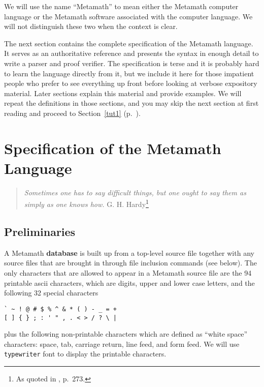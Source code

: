 We will use the name ``Metamath'' to mean either the Metamath
computer language or the Metamath software associated with the computer
language.  We will not distinguish these two when the context is clear.

The next section contains the complete specification of the Metamath
language.
It serves as an
authoritative reference and presents the syntax in enough detail to
write a parser and proof verifier.  The
specification is terse and it is probably hard to learn the language
directly from it, but we include it here for those impatient people who
prefer to see everything up front before looking at verbose expository
material.  Later sections explain this material and provide examples.
We will repeat the definitions in those sections, and you may skip the
next section at first reading and proceed to Section~\ref{tut1}
(p.~\pageref{tut1}).

\section{Specification of the Metamath Language}\label{spec}

\begin{quote}
  {\em Sometimes one has to say difficult things, but one ought to say
them as simply as one knows how.}
    \flushright\sc  G. H. Hardy\footnote{As quoted in
    \cite{deMillo}, p.~273.}\\
\end{quote}

\subsection{Preliminaries}\label{spec1}

A Metamath {\bf database} is built up from a top-level source
file together with any source files that are brought in through file inclusion
commands (see below).  The only characters that are allowed to appear in a
Metamath source file are the 94 printable {\sc
ascii} characters, which are digits, upper and lower
case letters, and the following 32 special characters
\label{spec1chars}

\begin{verbatim}
` ~ ! @ # $ % ^ & * ( ) - _ = +
[ ] { } ; : ' " , . < > / ? \ |
\end{verbatim}
plus the following non-printable characters which are
defined as ``white space'' characters: space, tab,
carriage return, line feed, and form feed.\label{whitespace}
We will use \texttt{typewriter}
font to display the printable characters.

